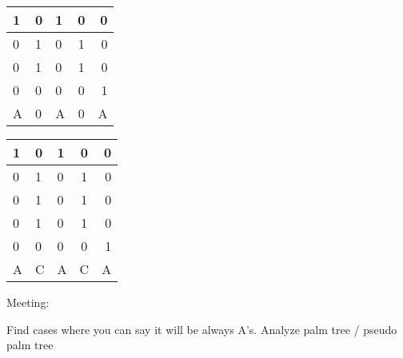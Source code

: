 \begin{multicols}{2}

	\begin{tabular}{ l |l l c r }
	  
	  1 & 0 & 1 & 0 & 0 \\
	  \hline
	  0 & 1 & 0 & 1 & 0 \\
	  0 & 1 & 0 & 1 & 0 \\
	  0 & 0 & 0 & 0 & 1 \\
	  \hline	
	  A & 0 & A & 0 & A \\
	
	\end{tabular}
\columnbreak{|}
	\begin{tabular}{ l |l l c r }
	  
	  1 & 0 & 1 & 0 & 0 \\
	  \hline
	  0 & 1 & 0 & 1 & 0 \\
	  0 & 1 & 0 & 1 & 0 \\
	  0 & 1 & 0 & 1 & 0 \\
	  0 & 0 & 0 & 0 & 1 \\
	  \hline	
	  A & C & A & C & A \\
	
	\end{tabular}

\end{multicols}

Meeting:

	Find cases where you can say it will be always A's.
	Analyze palm tree / pseudo palm tree 